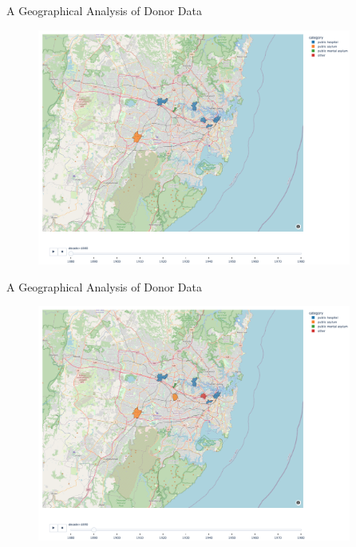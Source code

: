 \documentclass[]{beamer}
\begin{document}
\begin{frame}{A Geographical Analysis of Donor Data}
	\begin{figure}
		\includegraphics[width=0.92\textwidth]{img/choropleth_time/choropleth-1.png}
	\end{figure}
\end{frame}

\begin{frame}{A Geographical Analysis of Donor Data}
	\begin{figure}
		\includegraphics[width=0.92\textwidth]{img/choropleth_time/choropleth-2.png}
	\end{figure}
\end{frame}
\end{document}
